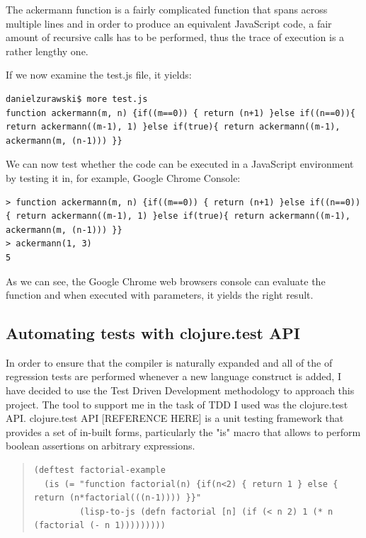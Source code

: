 The ackermann function is a fairly complicated function that spans across multiple lines and in order to produce an equivalent JavaScript code, a fair amount of recursive calls has to be performed, thus the trace of execution is a rather lengthy one. 

If we now examine the test.js file, it yields:

\begin{verbatim}
danielzurawski$ more test.js
function ackermann(m, n) {if((m==0)) { return (n+1) }else if((n==0)){ return ackermann((m-1), 1) }else if(true){ return ackermann((m-1), ackermann(m, (n-1))) }}
\end{verbatim}

We can now test whether the code can be executed in a JavaScript environment by testing it in, for example, Google Chrome Console: 

\begin{verbatim}
> function ackermann(m, n) {if((m==0)) { return (n+1) }else if((n==0)){ return ackermann((m-1), 1) }else if(true){ return ackermann((m-1), ackermann(m, (n-1))) }}
> ackermann(1, 3)
5
\end{verbatim}

As we can see, the Google Chrome web browsers console can evaluate the function and when executed with parameters, it yields the right result. 

\subsection{Automating tests with clojure.test API}
In order to ensure that the compiler is naturally expanded and all of the of regression tests are performed whenever a new language construct is added, I have decided to use the Test Driven Development methodology to approach this project. 
The tool to support me in the task of TDD I used was the clojure.test API.
clojure.test API [REFERENCE HERE] is a unit testing framework that provides a set of in-built forms, particularly the "is" macro that allows to perform boolean assertions on arbitrary expressions. 

\begin{quote}
\begin{verbatim}
(deftest factorial-example
  (is (= "function factorial(n) {if(n<2) { return 1 } else { return (n*factorial(((n-1)))) }}"
         (lisp-to-js (defn factorial [n] (if (< n 2) 1 (* n (factorial (- n 1)))))))))
\end{verbatim}
\end{quote}

